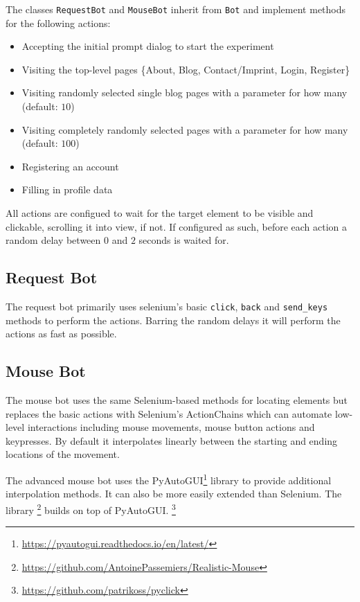 \documentclass[
    fontsize=12pt,
    headings=small,
    parskip=half,           %
    bibliography=totoc,
    numbers=noenddot,       %
    open=any,               %
    final                   %
]{scrreprt}
\begin{document}
The classes \lstinline{RequestBot} and \lstinline{MouseBot} inherit from \lstinline{Bot} and implement methods for the following actions:

\begin{itemize}
	\item Accepting the initial prompt dialog to start the experiment
	\item Visiting the top-level pages \{About, Blog, Contact/Imprint, Login, Register\}
	\item Visiting randomly selected single blog pages with a parameter for how many (default: $10$)
	\item Visiting completely randomly selected pages with a parameter for how many (default: $100$)
	\item Registering an account
	\item Filling in profile data
\end{itemize}

All actions are configued to wait for the target element to be visible and clickable, scrolling it into view, if not. If configured as such, before each action a random delay between $0$ and $2$ seconds is waited for.

\subsection{Request Bot}

The request bot primarily uses selenium's basic \lstinline{click}, \lstinline{back} and \lstinline{send_keys} methods to perform the actions. Barring the random delays it will perform the actions as fast as possible.

\subsection{Mouse Bot}

The mouse bot uses the same Selenium-based methods for locating elements but replaces the basic actions with Selenium's ActionChains which can automate low-level interactions including mouse movements, mouse button actions and keypresses. By default it interpolates linearly between the starting and ending locations of the movement.

The advanced mouse bot uses the PyAutoGUI\footnote{\url{https://pyautogui.readthedocs.io/en/latest/}} library to provide additional interpolation methods. It can also be more easily extended than Selenium.
The library \footnote{\url{https://github.com/AntoinePassemiers/Realistic-Mouse}} builds on top of PyAutoGUI.
\footnote{\url{https://github.com/patrikoss/pyclick}}
\end{document}

